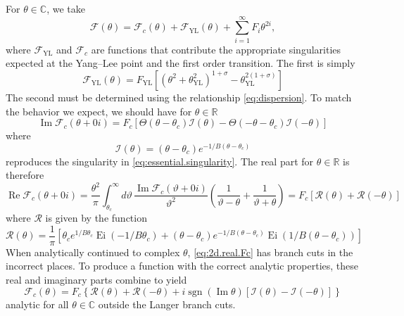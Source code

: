 \documentclass[
  aps,
  pre,
  preprint,
  longbibliography,
  floatfix
]{revtex4-2}
\begin{document}
For $\theta\in\mathbb C$, we take
\begin{equation}
  \mathcal F(\theta)=\mathcal F_c(\theta)+\mathcal F_{\mathrm{YL}}(\theta)+\sum_{i=1}^\infty F_{i}\theta^{2i},
\end{equation}
where $\mathcal F_{\textrm{YL}}$ and $\mathcal F_c$ are functions that
contribute the appropriate singularities expected at the Yang--Lee point and
the first order transition. The first is simply
\begin{equation}
  \mathcal F_{\mathrm{YL}}(\theta)=F_{\mathrm{YL}}\left[(\theta^2+\theta_{\mathrm{YL}}^2)^{1+\sigma}-\theta_{\mathrm{YL}}^{2(1+\sigma)}\right]
\end{equation}
The second must be determined using the relationship \eqref{eq:dispersion}. To
match the behavior we expect, we should have for $\theta\in\mathbb R$
\begin{equation}
  \operatorname{Im}\mathcal F_c(\theta+0i)=F_c[\Theta(\theta-\theta_c)\mathcal I(\theta)-\Theta(-\theta-\theta_c)\mathcal I(-\theta)]
\end{equation}
where 
\begin{equation}
  \mathcal I(\theta)=(\theta-\theta_c)e^{-1/B(\theta-\theta_c)}
\end{equation}
reproduces the singularity in \eqref{eq:essential.singularity}.
The real part for $\theta\in\mathbb R$ is therefore
\begin{equation} \label{eq:2d.real.Fc}
  \operatorname{Re}\mathcal F_c(\theta+0i)
  =\frac{\theta^2}{\pi}
  \int_{\theta_c}^\infty d\vartheta\,\frac{\operatorname{Im}\mathcal F_c(\vartheta+0i)}{\vartheta^2}\left(\frac1{\vartheta-\theta}+\frac1{\vartheta+\theta}\right)
  =F_c[\mathcal R(\theta)+\mathcal R(-\theta)]
\end{equation}
where $\mathcal R$ is given by the function
\begin{equation}
  \mathcal R(\theta)
  =\frac1\pi\left[
    \theta_ce^{1/B\theta_c}\operatorname{Ei}(-1/B\theta_c)
    +(\theta-\theta_c)e^{-1/B(\theta-\theta_c)}\operatorname{Ei}(1/B(\theta-\theta_c))
  \right]
\end{equation}
When analytically continued to complex $\theta$, \eqref{eq:2d.real.Fc} has branch cuts in the incorrect places. To produce a function with the correct analytic properties, these real and imaginary parts combine to yield
\begin{equation}
  \mathcal F_c(\theta)=F_c\left\{
    \mathcal R(\theta)+\mathcal R(-\theta)+i\operatorname{sgn}(\operatorname{Im}\theta)[\mathcal I(\theta)-\mathcal I(-\theta)]
  \right\}
\end{equation}
analytic for all $\theta\in\mathbb C$ outside the Langer branch cuts.
\end{document}
